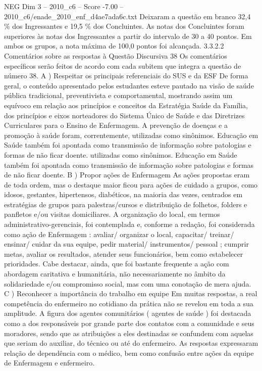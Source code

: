 \begin{textsample}{NEG Dim 3 – 2010\_c6 – Score -7.00 – 2010\_c6/enade\_2010\_enf\_d4ae7ada6c.txt}
Deixaram a questão em branco 32,4 \% dos Ingressantes e 19,5 \% dos Concluintes.
As notas dos Concluintes foram superiores às notas dos Ingressantes a partir do intervalo de 30 a 40 pontos.
Em ambos os grupos, a nota máxima de 100,0 pontos foi alcançada. 3.3.2.2 Comentários sobre as respostas à Questão Discursiva 38 Os comentários específicos serão feitos de acordo com cada subitem que integra a questão de número 38.
A ) Respeitar os principais referenciais do SUS e da ESF De forma geral, o conteúdo apresentado pelos estudantes esteve pautado na visão de saúde pública tradicional, preventivista e comportamental, mostrando assim um equívoco em relação aos princípios e conceitos da Estratégia Saúde da Família, dos princípios e eixos norteadores do Sistema Único de Saúde e das Diretrizes Curriculares para o Ensino de Enfermagem.
A prevenção de doenças e a promoção à saúde foram, correntemente, utilizadas como sinônimos.
Educação em Saúde também foi apontada como transmissão de informação sobre patologias e formas de não ficar doente. utilizadas como sinônimos.
Educação em Saúde também foi apontada como transmissão de informação sobre patologias e formas de não ficar doente.
B ) Propor ações de Enfermagem As ações propostas eram de toda ordem, mas o destaque maior ficou para ações de cuidado a grupos, como idosos, gestantes, hipertensos, diabéticos, na maioria das vezes, centrados em estratégias de grupos para palestras/cursos e distribuição de folhetos, folders e panfletos e/ou visitas domiciliares.
A organização do local, em termos administrativo-gerenciais, foi contemplada e, conforme a redação, foi considerada como ação de Enfermagem : avaliar/ organizar o local, capacitar/ treinar/ ensinar/ cuidar da sua equipe, pedir material/ instrumentos/ pessoal ; cumprir metas, avaliar os resultados, atender seus funcionários, bem como estabelecer prioridades.
Cabe destacar, ainda, que foi bastante frequente a ação com abordagem caritativa e humanitária, não necessariamente no âmbito da solidariedade e/ou compromisso social, mas com uma conotação de mera ajuda.
C ) Reconhecer a importância do trabalho em equipe Em muitas respostas, a real competência do enfermeiro no cotidiano da prática não se revelou em toda a sua amplitude.
A figura dos agentes comunitários ( agentes de saúde ) foi destacada como a dos responsáveis por grande parte dos contatos com a comunidade e seus moradores, sendo que as atribuições a eles destinadas se confundem com aquelas que seriam do auxiliar, do técnico ou até do enfermeiro.
As respostas expressaram relação de dependência com o médico, bem como confusão entre ações da equipe de Enfermagem e enfermeiro.

\end{textsample}
